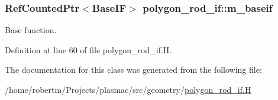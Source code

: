 \subsubsection[{\texorpdfstring{m\+\_\+baseif}{m_baseif}}]{\setlength{\rightskip}{0pt plus 5cm}Ref\+Counted\+Ptr$<$Base\+IF$>$ polygon\+\_\+rod\+\_\+if\+::m\+\_\+baseif\hspace{0.3cm}{\ttfamily [protected]}}\hypertarget{classpolygon__rod__if_a1c1210b6d3fd3d18afcfb778f2e06828}{}\label{classpolygon__rod__if_a1c1210b6d3fd3d18afcfb778f2e06828}


Base function. 



Definition at line 60 of file polygon\+\_\+rod\+\_\+if.\+H.



The documentation for this class was generated from the following file\+:\begin{DoxyCompactItemize}
\item 
/home/robertm/\+Projects/plasmac/src/geometry/\hyperlink{polygon__rod__if_8H}{polygon\+\_\+rod\+\_\+if.\+H}\end{DoxyCompactItemize}
